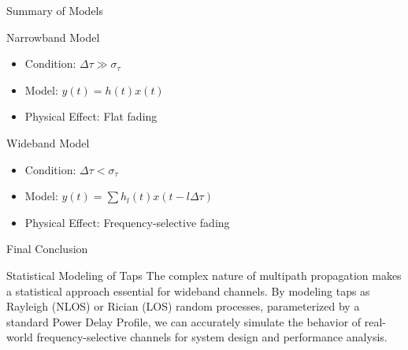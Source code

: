 \documentclass{beamer}
\begin{document}
	\begin{frame}{Summary of Models}
		\begin{block}{Narrowband Model}
			\begin{itemize}
				\item Condition: $\Delta\tau \gg \sigma_\tau$
				\item Model: $y(t) = h(t)x(t)$
				\item Physical Effect: Flat fading
			\end{itemize}
		\end{block}
		
		\begin{block}{Wideband Model}
			\begin{itemize}
				\item Condition: $\Delta\tau < \sigma_\tau$
				\item Model: $y(t) = \sum h_l(t)x(t-l\Delta\tau)$
				\item Physical Effect: Frequency-selective fading
			\end{itemize}
		\end{block}
	\end{frame}
	
	\begin{frame}{Final Conclusion}
		\begin{alertblock}{Statistical Modeling of Taps}
			The complex nature of multipath propagation makes a statistical approach essential for wideband channels. By modeling taps as Rayleigh (NLOS) or Rician (LOS) random processes, parameterized by a standard Power Delay Profile, we can accurately simulate the behavior of real-world frequency-selective channels for system design and performance analysis.
		\end{alertblock}
	\end{frame}
	
\end{document}
